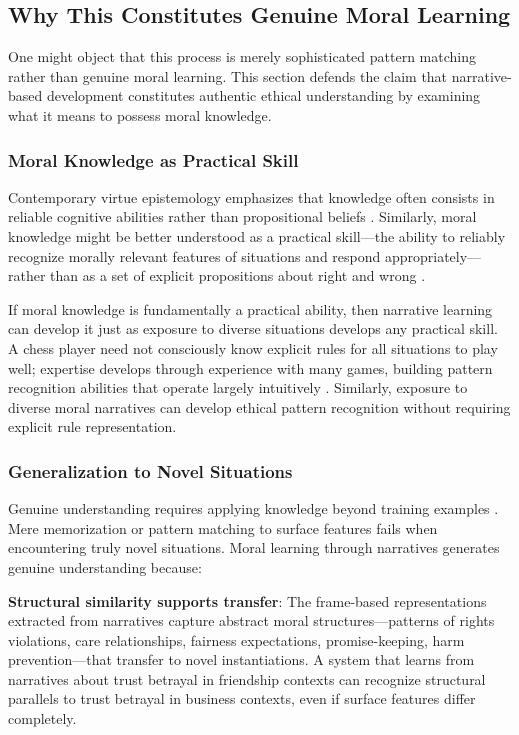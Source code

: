 \documentclass[12pt]{article}
\begin{document}
\subsection{Why This Constitutes Genuine Moral Learning}

One might object that this process is merely sophisticated pattern matching rather than genuine moral learning. This section defends the claim that narrative-based development constitutes authentic ethical understanding by examining what it means to possess moral knowledge.

\subsubsection{Moral Knowledge as Practical Skill}

Contemporary virtue epistemology emphasizes that knowledge often consists in reliable cognitive abilities rather than propositional beliefs \citep{sosa2007apt, greco2010achievements}. Similarly, moral knowledge might be better understood as a practical skill---the ability to reliably recognize morally relevant features of situations and respond appropriately---rather than as a set of explicit propositions about right and wrong \citep{dreyfus2000could, ryle1949concept}.

If moral knowledge is fundamentally a practical ability, then narrative learning can develop it just as exposure to diverse situations develops any practical skill. A chess player need not consciously know explicit rules for all situations to play well; expertise develops through experience with many games, building pattern recognition abilities that operate largely intuitively \citep{chase1973perception}. Similarly, exposure to diverse moral narratives can develop ethical pattern recognition without requiring explicit rule representation.

\subsubsection{Generalization to Novel Situations}

Genuine understanding requires applying knowledge beyond training examples \citep{mitchell2021debate}. Mere memorization or pattern matching to surface features fails when encountering truly novel situations. Moral learning through narratives generates genuine understanding because:

\textbf{Structural similarity supports transfer}: The frame-based representations extracted from narratives capture abstract moral structures---patterns of rights violations, care relationships, fairness expectations, promise-keeping, harm prevention---that transfer to novel instantiations. A system that learns from narratives about trust betrayal in friendship contexts can recognize structural parallels to trust betrayal in business contexts, even if surface features differ completely.
\end{document}
